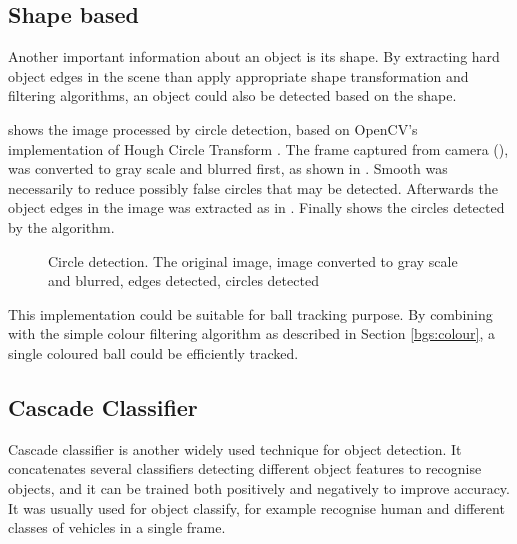 \subsection{Shape based}

Another important information about an object is its shape. By extracting hard object edges in the scene than apply appropriate shape transformation and filtering algorithms, an object could also be detected based on the shape.

 shows the image processed by circle detection, based on OpenCV's implementation of Hough Circle Transform \cite{opencv:hough_circle}. The frame captured from camera (), was converted to gray scale and blurred first, as shown in . Smooth was necessarily to reduce possibly false circles that may be detected. Afterwards the object edges in the image was extracted as in . Finally  shows the circles detected by the algorithm.

\begin{figure}[H]
  \centering
  \caption{Circle detection.  The original image,  image converted to gray scale and blurred,  edges detected,  circles detected}
  \label{Figure:circles}
\end{figure}

This implementation could be suitable for ball tracking purpose. By combining with the simple colour filtering algorithm as described in Section \ref{bgs:colour}, a single coloured ball could be efficiently tracked.

\subsection{Cascade Classifier}

Cascade classifier \cite{cascade} is another widely used technique for object detection. It concatenates several classifiers detecting different object features to recognise objects, and it can be trained both positively and negatively to improve accuracy. It was usually used for object classify, for example recognise human and different classes of vehicles in a single frame.

